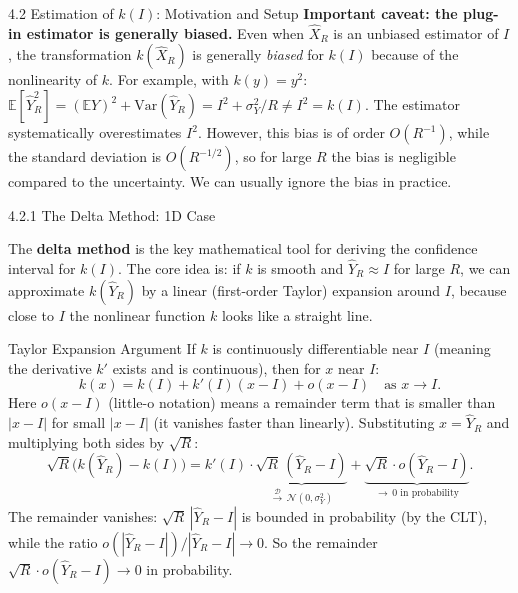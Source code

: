 \documentclass[aspectratio=169,10pt]{beamer}
\begin{document}
\begin{frame}[allowframebreaks]{4.2 Estimation of $k(I)$: Motivation and Setup}
\textbf{Important caveat: the plug-in estimator is generally biased.}
Even when $\hat{X}_R$ is an unbiased estimator of $I$, the transformation
$k(\hat{X}_R)$ is generally \emph{biased} for $k(I)$ because of the
nonlinearity of $k$.  For example, with $k(y) = y^2$:
$\mathbb{E}[\hat{Y}_R^2] = (\mathbb{E}Y)^2 + \mathrm{Var}(\hat{Y}_R)
= I^2 + \sigma_Y^2/R \neq I^2 = k(I)$.
The estimator systematically overestimates $I^2$.  However, this bias
is of order $O(R^{-1})$, while the standard deviation is $O(R^{-1/2})$,
so for large $R$ the bias is negligible compared to the uncertainty.
We can usually ignore the bias in practice.

\end{frame}

\begin{frame}[allowframebreaks]{4.2.1 The Delta Method: 1D Case}

The \textbf{delta method} is the key mathematical tool for deriving the
confidence interval for $k(I)$.  The core idea is: if $k$ is smooth
and $\hat{Y}_R \approx I$ for large $R$, we can approximate $k(\hat{Y}_R)$
by a linear (first-order Taylor) expansion around $I$, because close to
$I$ the nonlinear function $k$ looks like a straight line.

\begin{block}{Taylor Expansion Argument}
  If $k$ is continuously differentiable near $I$ (meaning the derivative
  $k'$ exists and is continuous), then for $x$ near $I$:
  \[
    k(x) = k(I) + k'(I)(x - I) + o(x - I) \quad \text{as } x \to I.
  \]
  Here $o(x-I)$ (little-o notation) means a remainder term that is
  smaller than $|x-I|$ for small $|x-I|$ (it vanishes faster than
  linearly).  Substituting $x = \hat{Y}_R$ and multiplying both sides
  by $\sqrt{R}$:
  \[
    \sqrt{R}\bigl(k(\hat{Y}_R) - k(I)\bigr)
    = k'(I) \cdot \underbrace{\sqrt{R}\,(\hat{Y}_R - I)}_{\xrightarrow{\mathcal{D}}\,\mathcal{N}(0,\sigma_Y^2)}
    + \underbrace{\sqrt{R}\cdot o(\hat{Y}_R - I)}_{\to\,0\text{ in probability}}.
  \]
  The remainder vanishes: $\sqrt{R}\,|\hat{Y}_R - I|$ is bounded in
  probability (by the CLT), while the ratio $o(|\hat{Y}_R-I|)/|\hat{Y}_R-I| \to 0$.
  So the remainder $\sqrt{R}\cdot o(\hat{Y}_R - I) \to 0$ in probability.
\end{block}


\end{frame}
\end{document}
